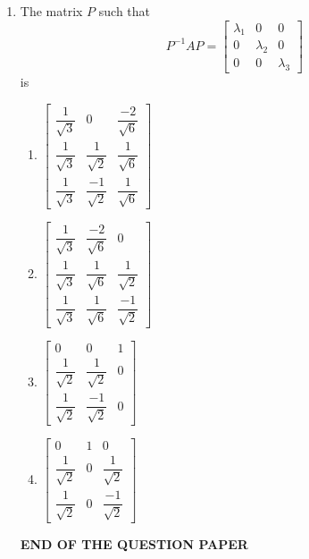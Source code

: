 \documentclass[journal]{IEEEtran}
\newcommand{\myvec}[1]{\begin{bmatrix}#1\end{bmatrix}}
\numberwithin{equation}{enumi}
\numberwithin{figure}{enumi}
\begin{document}
\begin{enumerate}
\item The matrix $P$ such that   \hfill{}
\[
P^{-1} A P = \begin{bmatrix}
\lambda_1 & 0 & 0 \\
0 & \lambda_2 & 0 \\
0 & 0 & \lambda_3
\end{bmatrix}
 \]
is 
\begin{multicols}{2}
    \begin{enumerate}
        \item  $\myvec{
    \dfrac{1}{\sqrt{3}} & 0 & \dfrac{-2}{\sqrt{6}} \\
    \dfrac{1}{\sqrt{3}} & \dfrac{1}{\sqrt{2}} & \dfrac{1}{\sqrt{6}} \\
    \dfrac{1}{\sqrt{3}} & \dfrac{-1}{\sqrt{2}} & \dfrac{1}{\sqrt{6}}
    }$
        \item $\myvec{
    \dfrac{1}{\sqrt{3}} & \dfrac{-2}{\sqrt{6}} & 0 \\
    \dfrac{1}{\sqrt{3}} & \dfrac{1}{\sqrt{6}} & \dfrac{1}{\sqrt{2}} \\
    \dfrac{1}{\sqrt{3}} & \dfrac{1}{\sqrt{6}} & \dfrac{-1}{\sqrt{2}}
    }$
        \item $\myvec{
    0 & 0 & 1 \\
    \dfrac{1}{\sqrt{2}} & \dfrac{1}{\sqrt{2}} & 0 \\
    \dfrac{1}{\sqrt{2}} & \dfrac{-1}{\sqrt{2}} & 0
   }$
        \item $\myvec{
    0 & 1 & 0 \\
    \dfrac{1}{\sqrt{2}} & 0 & \dfrac{1}{\sqrt{2}} \\
    \dfrac{1}{\sqrt{2}} & 0 & \dfrac{-1}{\sqrt{2}}
    }$
    \end{enumerate}
    \end{multicols}




\vspace{5em}
\begin{center}
    \textbf{END OF THE QUESTION PAPER}
\end{center}

\end{enumerate}
\end{document}
